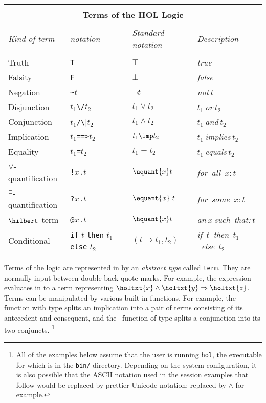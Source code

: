 \begin{center}
\begin{tabular}{|l|l|l|l|} \hline
\multicolumn{4}{|c|}{ } \\
\multicolumn{4}{|c|}{\bf Terms of the HOL Logic} \\
\multicolumn{4}{|c|}{ } \\
{\it Kind of term} & {\it \HOL{} notation} &
{\it Standard notation} &
{\it Description} \\ \hline
 & & & \\
Truth & {\small\verb|T|} & $\top$ & {\it true}\\ \hline
Falsity & {\small\verb|F|} & $\bot$ & {\it false}\\ \hline
Negation & {\small\verb|~|}$t$ & $\neg t$ & {\it not}$\ t$\\ \hline
Disjunction & $t_1${\small\verb|\/|}$t_2$ & $t_1\vee t_2$ &
$t_1\ ${\it or}$\ t_2$ \\ \hline
Conjunction & $t_1${\small\verb|/\|}$t_2$ & $t_1\wedge t_2$ &
$t_1\ ${\it and}$\ t_2$ \\ \hline
Implication & $t_1${\small\verb|==>|}$t_2$ & $t_1\imp t_2$ &
$t_1\ ${\it implies}$\ t_2$ \\ \hline
Equality & $t_1${\small\verb|=|}$t_2$ & $t_1 = t_2$ &
$t_1\ ${\it equals}$\ t_2$ \\ \hline
$\forall$-quantification & {\small\verb|!|}$x${\small\verb|.|}$t$ &
$\uquant{x}t$ & {\it for\ all\ }$x: t$ \\ \hline
$\exists$-quantification & {\small\verb|?|}$x${\small\verb|.|}$t$ &
$\equant{x}\ t$ & {\it for\ some\ }$x: t$ \\ \hline
$\hilbert$-term & {\small\verb|@|}$x${\small\verb|.|}$t$ &
$\hquant{x}t$ & {\it an}$\ x\ ${\it such\ that:}$\ t$ \\ \hline
Conditional & {\small\verb|if|} $t$ {\small\verb|then|} $t_1$
              {\small\verb|else|} $t_2$ &
$(t\rightarrow t_1, t_2)$ & {\it if\ }$t${\it \ then\ }$t_1${\it\ else\ }$t_2$
 \\ \hline
\end{tabular}
\end{center}\label{logic-table}

Terms of the \HOL{} logic are represented in \ML{} by an \emph{abstract type} called {\small\verb|term|}.
They are normally input between double back-quote marks.
For example, the expression  evaluates in \ML{} to a term representing $\holtxt{x} \land \holtxt{y} \Rightarrow \holtxt{z}$.
Terms can be manipulated by various built-in \ML{} functions.
For example, the \ML{} function  with \ML{} type  splits an implication into a pair of terms consisting of its antecedent and consequent, and the \ML\ function  of type  splits a conjunction into its two conjuncts.%
\footnote{All of the examples below assume that the user is running \texttt{hol}, the executable for which is in the \texttt{bin/} directory.
Depending on the system configuration, it is also possible that the ASCII notation used in the session examples that follow would be replaced by prettier Unicode notation: \holtxt{/\bs} replaced by $\land$ for example.}

